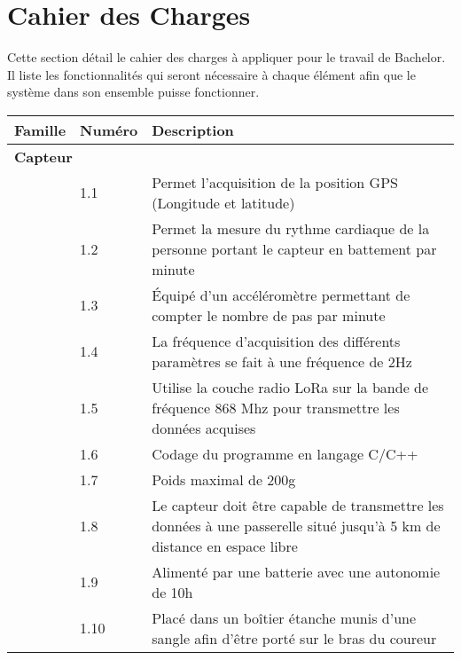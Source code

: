 \chapter{Cahier des Charges}

Cette section détail le cahier des charges à appliquer pour le travail de Bachelor. Il liste les fonctionnalités qui seront nécessaire à chaque élément afin que le système dans son ensemble puisse fonctionner.

\begin{tabular}{llp{10cm}}
\toprule
Famille & Numéro & Description \\
\midrule
\multicolumn{2}{l}{\textbf{Capteur}} \\
 & 1.1 & Permet l’acquisition de la position GPS (Longitude et latitude) \\
 & 1.2 & Permet la mesure du rythme cardiaque de la personne portant le capteur en battement par minute\\
 & 1.3 & Équipé d’un accéléromètre permettant de compter le nombre de pas par minute \\
 & 1.4 & La fréquence d’acquisition des différents paramètres se fait à une fréquence de 2Hz \\
 & 1.5 & Utilise la couche radio LoRa sur la bande de fréquence 868 Mhz pour transmettre les données acquises \\
 & 1.6 & Codage du programme en langage C/C++ \\
 & 1.7 & Poids maximal de 200g \\
 & 1.8 & Le capteur doit être capable de transmettre les données à une passerelle situé jusqu’à 5 km de distance en espace libre \\
 & 1.9 & Alimenté par une batterie avec une autonomie de 10h \\
 & 1.10 & Placé dans un boîtier étanche munis d’une sangle afin d’être porté sur le bras du coureur \\
\bottomrule
\end{tabular}

